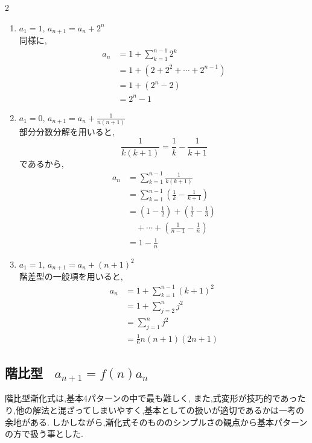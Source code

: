 \documentclass[dvipdfmx,a4paper,11pt,fleqn,openany]{jsbook}
\begin{document}
\begin{multicols*}{2}
\begin{enumerate}[label=(\arabic*),parsep=3pt]
        \item $\displaystyle a_1=1,\,a_{n+1}=a_n+2^n$\\
              同様に,
              \begin{align*}
                a_n
                  &=1+\sum_{k=1}^{n-1}2^k\\
                  &=1+(2+2^2+\cdots+2^{n-1})\\
                  &=1+(2^n-2)\\
                  &=2^n-1
              \end{align*}

        \item $\displaystyle a_1=0,\,a_{n+1}=a_n+\frac{1}{n(n+1)}$\\
              部分分数分解を用いると,
              \[
                \frac{1}{k(k+1)}
                =\frac{1}{k}-\frac{1}{k+1}
              \]
              であるから,
              \begin{align*}
                a_n
                  &=\sum_{k=1}^{n-1}\frac{1}{k(k+1)}\\
                  &=\sum_{k=1}^{n-1}
                    \left(\frac{1}{k}-\frac{1}{k+1}\right)\\
                  &=\left(1-\frac12\right)
                    +\left(\frac12-\frac13\right)\\
                  &\quad +\cdots+\left(\frac{1}{n-1}-\frac1n\right)\\
                  &=1-\frac1n
              \end{align*}

        \item $\displaystyle a_1=1,\,a_{n+1}=a_n+(n+1)^2$\\
              階差型の一般項を用いると,
              \begin{align*}
                a_n
                  &=1+\sum_{k=1}^{n-1}(k+1)^2\\
                  &=1+\sum_{j=2}^{n}j^2\\
                  &=\sum_{j=1}^{n}j^2\\
                  &=\frac{1}{6}n(n+1)(2n+1)
              \end{align*}
      \end{enumerate}
    \subsection{階比型 \, $a_{n+1}=f(n)a_n$}
      階比型漸化式は,基本4パターンの中で最も難しく,
      また,式変形が技巧的であったり,他の解法と混ざってしまいやすく,基本としての扱いが適切であるかは一考の余地がある.
      しかしながら,漸化式そのもののシンプルさの観点から基本パターンの方で扱う事とした.
      

\end{multicols*}
\end{document}
